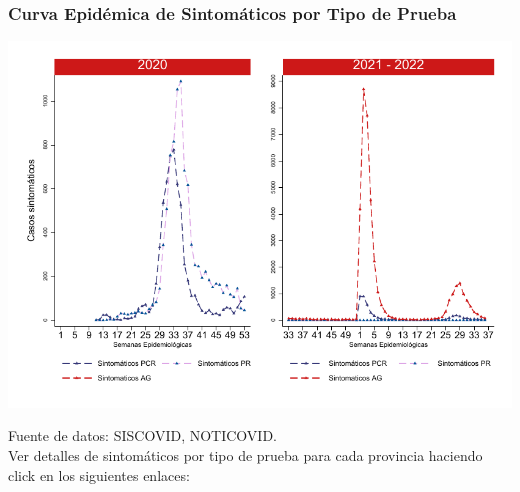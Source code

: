 \documentclass[xcolor=table]{beamer}
\begin{document}
	\begin{frame}[label=TipoPrueba]
		\frametitle{Curva Epidémica de Sintomáticos por Tipo de Prueba}
		\vspace{-.15cm}
		\begin{center}
			\includegraphics[width=0.7\linewidth, trim={0cm 0cm 0cm 0cm},clip]{../figuras/sinto_prueba_20_21_22.pdf}
		\end{center}
	\vspace{-.5cm}
		{\tiny Fuente de datos: SISCOVID, NOTICOVID.}\\
		Ver detalles de sintomáticos por tipo de prueba para cada provincia haciendo click en los siguientes enlaces:
		\hyperlink{Acomayo}{} 
		\hyperlink{Anta}{} 
		\hyperlink{Calca}{} 
		\hyperlink{Canas}{} \hyperlink{Chumbivilcas}{}
		\hyperlink{Canchis}{} 
		\hyperlink{Cusco}{}
		\hyperlink{Espinar}{}
		\hyperlink{laconvecion}{}
		\hyperlink{Paruro}{} \hyperlink{Paucartambo}{}
		\hyperlink{Quispicanchi}{}
		\hyperlink{Urubamba}{}
	\end{frame}
	
\end{document}
